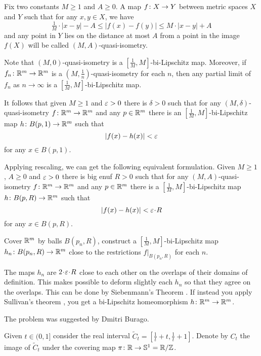 Fix two constants $M\ge 1$ and $A\ge 0$.
A map $f\:X\z\to Y$ between metric spaces $X$ and $Y$ such that for any $x,y\in X$,
 we have
\[\tfrac1M\cdot |x-y|-A\le |f(x)-f(y)|\le M\cdot |x-y|+A\]
and any point in $Y$ lies on the distance at most $A$ from a point in the image $f(X)$
will be called $(M,A)$-quasi-isometry.

{\sloppy
Note that $(M,0)$-quasi-isometry is a $[\tfrac1M,M]$-bi-Lipschitz map.
Moreover,
if $f_n\colon\mathbb{R}^m\to\mathbb{R}^m$ is a  $(M,\frac1n)$-quasi-isometry 
for each $n$, 
then any partial limit of $f_n$ as $n\to\infty$
is a $[\tfrac1M,M]$-bi-Lipschitz map.

}

It follows that given $M\ge 1$ and $\varepsilon>0$ there is $\delta>0$ such that 
for any $(M,\delta)$-quasi-isometry $f\colon\mathbb{R}^m\to\mathbb{R}^m$ and any $p\in \mathbb{R}^m$
there is an $[\tfrac1M,M]$-bi-Lipschitz map $h\colon B(p,1)\to \mathbb{R}^m$
such that
\[|f(x)-h(x)|<\varepsilon\]
for any $x\in B(p,1)$.

Applying rescaling, we can get the following equivalent formulation. 
Given $M\ge 1$, $A\ge 0$ and $\varepsilon>0$
there is big enuf $R>0$ such that for any $(M,A)$-quasi-isometry 
$f\colon\mathbb{R}^m\to\mathbb{R}^m$ and any $p\in\mathbb{R}^m$ there is a $[\tfrac1M,M]$-bi-Lipschitz map $h\colon B(p,R)\to \mathbb{R}^m$
such that 
\[|f(x)-h(x)|<\eps\cdot R\]
for any $x\in B(p,R)$.

Cover $\mathbb{R}^m$ by balls
$B(p_n,R)$, construct a $[\tfrac1M,M]$-bi-Lipschitz map $h_n\colon B(p_n,R)\to \mathbb{R}^m$ close to the restrictions $f|_{B(p_n,R)}$ for each $n$.

The maps $h_n$ are $2\cdot \eps\cdot R$ close to each other on the overlaps of their domains of definition.
This makes possible to deform slightly each $h_n$ so that they agree on the overlaps.
This can be done by Siebenmann's Theorem \cite[see][]{siebenmann}.
If instead you apply Sullivan's theorem \cite[see][]{sullivan}, you get a bi-Lipschitz homeomorphism $h\:\RR^m\z\to\RR^m$.\qeds


The problem was suggested by Dmitri Burago.





Given $t\in (0,1]$ consider the real interval $\tilde C_t=[\tfrac 1t+t, \tfrac 1t+1]$.
Denote by $C_t$ the image of $\tilde C_t$ under the covering map $\pi\colon\mathbb{R}\to \mathbb{S}^1=\mathbb{R}/\mathbb{Z}$.

